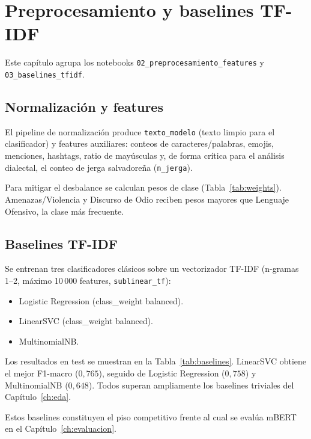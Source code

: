 \chapter{Preprocesamiento y baselines TF-IDF}
\label{ch:baselines}

Este capítulo agrupa los notebooks \texttt{02\_preprocesamiento\_features} y
\texttt{03\_baselines\_tfidf}.

\section{Normalización y features}

El pipeline de normalización produce \texttt{texto\_modelo} (texto limpio para el
clasificador) y features auxiliares: conteos de caracteres/palabras, emojis,
menciones, hashtags, ratio de mayúsculas y, de forma crítica para el análisis
dialectal, el conteo de jerga salvadoreña (\texttt{n\_jerga}).

Para mitigar el desbalance se calculan pesos de clase (Tabla~\ref{tab:weights}).
Amenazas/Violencia y Discurso de Odio reciben pesos mayores que Lenguaje
Ofensivo, la clase más frecuente.

\begin{table}[H]
\centering
\caption{Pesos de clase usados en el entrenamiento.}
\label{tab:weights}

\end{table}

\section{Baselines TF-IDF}

Se entrenan tres clasificadores clásicos sobre un vectorizador TF-IDF
(n-gramas 1--2, máximo 10\,000 features, \texttt{sublinear\_tf}):

\begin{itemize}[leftmargin=*]
  \item Logistic Regression (class\_weight balanced).
  \item LinearSVC (class\_weight balanced).
  \item MultinomialNB.
\end{itemize}

Los resultados en test se muestran en la Tabla~\ref{tab:baselines}. LinearSVC
obtiene el mejor F1-macro ($0{,}765$), seguido de Logistic Regression
($0{,}758$) y MultinomialNB ($0{,}648$). Todos superan ampliamente los baselines
triviales del Capítulo~\ref{ch:eda}.

\begin{table}[H]
\centering
\caption{Baselines TF-IDF en el conjunto de prueba (F1-macro).}
\label{tab:baselines}

\end{table}

Estos baselines constituyen el piso competitivo frente al cual se evalúa mBERT
en el Capítulo~\ref{ch:evaluacion}.

